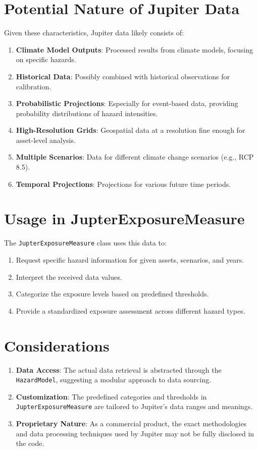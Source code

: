 \documentclass{article}
\begin{document}
\section{Potential Nature of Jupiter Data}

Given these characteristics, Jupiter data likely consists of:

\begin{enumerate}
    \item \textbf{Climate Model Outputs}: Processed results from climate models, focusing on specific hazards.
    \item \textbf{Historical Data}: Possibly combined with historical observations for calibration.
    \item \textbf{Probabilistic Projections}: Especially for event-based data, providing probability distributions of hazard intensities.
    \item \textbf{High-Resolution Grids}: Geospatial data at a resolution fine enough for asset-level analysis.
    \item \textbf{Multiple Scenarios}: Data for different climate change scenarios (e.g., RCP 8.5).
    \item \textbf{Temporal Projections}: Projections for various future time periods.
\end{enumerate}

\section{Usage in JupterExposureMeasure}

The \texttt{JupterExposureMeasure} class uses this data to:

\begin{enumerate}
    \item Request specific hazard information for given assets, scenarios, and years.
    \item Interpret the received data values.
    \item Categorize the exposure levels based on predefined thresholds.
    \item Provide a standardized exposure assessment across different hazard types.
\end{enumerate}

\section{Considerations}

\begin{enumerate}
    \item \textbf{Data Access}: The actual data retrieval is abstracted through the \texttt{HazardModel}, suggesting a modular approach to data sourcing.
    \item \textbf{Customization}: The predefined categories and thresholds in \texttt{JupterExposureMeasure} are tailored to Jupiter's data ranges and meanings.
    \item \textbf{Proprietary Nature}: As a commercial product, the exact methodologies and data processing techniques used by Jupiter may not be fully disclosed in the code.
\end{enumerate}
\end{document}
